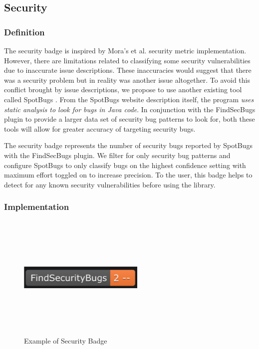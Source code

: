 \documentclass[12pt, letterpaper]{article}
\begin{document}
\subsection{Security}
\subsubsection{Definition}
The security badge is inspired by Mora's et al. \cite{metrics} security metric implementation.
However, there are limitations related to classifying some security vulnerabilities due to inaccurate
issue descriptions. These inaccuracies would suggest that there was a security problem but in reality was another issue altogether.
To avoid this conflict brought by issue descriptions, 
we propose to use another existing tool called SpotBugs \cite{spotbugs}.
From the SpotBugs \cite{spotbugs} website description itself, the program \textit{uses static analysis to look for bugs in Java code}.
In conjunction with the FindSecBugs \cite{findsecbugs} plugin to provide a larger data set of security bug patterns to look for, 
both these tools will allow for greater accuracy of targeting security bugs.

The security badge represents the number of security bugs reported by SpotBugs \cite{spotbugs} with the FindSecBugs \cite{findsecbugs} plugin.
We filter for only security bug patterns and configure SpotBugs to only classify bugs on the highest confidence setting
with maximum effort toggled on to increase precision. To the user, this badge helps to detect
for any known security vulnerabilities before using the library. 

\subsubsection{Implementation}

\begin{figure}[!htb]
    \centerline{
        \includegraphics[width=6cm,height=6cm,keepaspectratio=true]{findsecbugsbadge}
    }
    \caption{
        Example of Security Badge
    }
    \label{findsecbugsbadge}
\end{figure}
\end{document}
